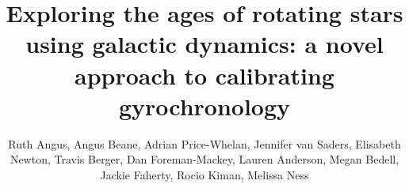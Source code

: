 \documentclass[useAMS, usenatbib, preprint, 12pt]{aastex}
\newcommand{\amnh}{1}
\newcommand{\cca}{2}
\newcommand{\hawaii}{3}
\begin{document}
\title{Exploring the ages of rotating stars using galactic dynamics: a novel
approach to calibrating gyrochronology}

\author{%
    Ruth Angus,
    Angus Beane,
    Adrian Price-Whelan,
    Jennifer van Saders,
    Elisabeth Newton,
    Travis Berger,
    Dan Foreman-Mackey,
    Lauren Anderson,
    Megan Bedell,
    Jackie Faherty,
    Rocio Kiman,
    Melissa Ness}




\begin{abstract}
    
\end{abstract}







% 







\end{document}
